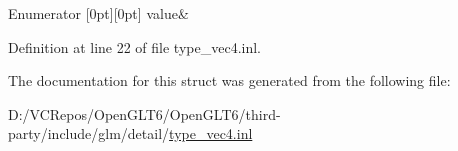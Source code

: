 \begin{DoxyEnumFields}{Enumerator}
[0pt][0pt]{}\mbox{\label{structglm_1_1detail_1_1is__int_3_01int32_01_4_ad400146c56b42f07c8c14c71c5f7322fa24dfcabf3ede34dbfc990ec0c0ed4264}} 
value&\\
\hline

\end{DoxyEnumFields}


Definition at line 22 of file type\+\_\+vec4.\+inl.



The documentation for this struct was generated from the following file\+:\begin{DoxyCompactItemize}
\item 
D\+:/\+V\+C\+Repos/\+Open\+G\+L\+T6/\+Open\+G\+L\+T6/third-\/party/include/glm/detail/\mbox{\hyperlink{type__vec4_8inl}{type\+\_\+vec4.\+inl}}\end{DoxyCompactItemize}
